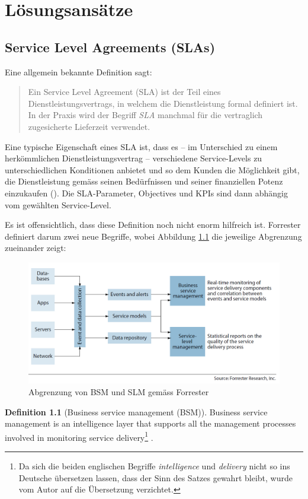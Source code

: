 \documentclass[11pt,listof=totoc]{scrreprt} %
\theoremstyle{definition}
\newtheorem{definition}{Definition}
\begin{document}
\chapter{Lösungsansätze}

\section{Service Level Agreements (SLAs)}
Eine allgemein bekannte Definition sagt:
\begin{quote}
Ein Service Level Agreement (SLA) ist der Teil eines Dienstleistungsvertrags, in welchem die Dienstleistung formal definiert ist. In der Praxis wird der Begriff {\em SLA} manchmal für die vertraglich zugesicherte Lieferzeit verwendet. \cite{wiki:sla}
\end{quote}

Eine typische Eigenschaft eines SLA ist, dass es -- im Unterschied zu einem herkömmlichen Dienstleistungsvertrag -- verschiedene Service-Levels zu unterschiedlichen Konditionen anbietet und so dem Kunden die Möglichkeit gibt, die Dienstleistung gemäss seinen Bedürfnissen und seiner finanziellen Potenz einzukaufen (\cite{EllisKauferstein200311}). Die SLA-Parameter, Objectives und KPIs sind dann abhängig vom gewählten Service-Level.

Es ist offensichtlich, dass diese Definition noch nicht enorm hilfreich ist. Forrester definiert darum zwei neue Begriffe, wobei Abbildung \ref{forr} die jeweilige Abgrenzung zueinander zeigt:

\begin{figure}
\label{forr}
\caption{Abgrenzung von BSM und SLM gemäss Forrester}
\includegraphics[scale=0.47]{biltli/forrester_bsm_slm.png}
\end{figure}

\begin{definition}[Business service management (BSM)] Business service management is an intelligence layer that supports all the management processes involved in monitoring service delivery\footnote{Da sich die beiden englischen Begriffe {\em intelligence} und {\em delivery} nicht so ins Deutsche übersetzen lassen, dass der Sinn des Satzes gewahrt bleibt, wurde vom Autor auf die Übersetzung verzichtet.} \cite{forrester:slaBestPractices}.
\end{definition}
\end{document}
